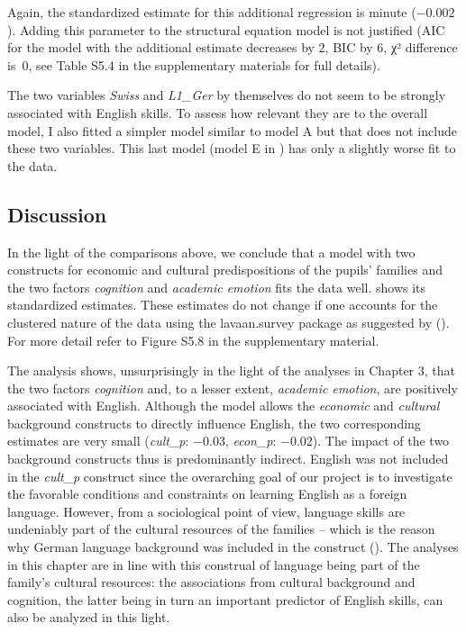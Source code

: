 \documentclass[output=paper]{langsci/langscibook}
\begin{document}
Again, the standardized estimate for this additional regression is minute ($-0.002$). Adding this parameter to the structural equation model is not justified (AIC for the model with the additional estimate decreases by 2, BIC by 6, χ² difference is~0, see Table S5.4 in the supplementary materials for full details).

The two variables \textit{Swiss} and \textit{L1\_Ger} by themselves do not seem to be strongly associated with English skills. To assess how relevant they are to the overall model, I also fitted a simpler model similar to model A but that does not include these two variables. This last model (model E in ) has only a slightly worse fit to the data.

\subsection{Discussion}

In the light of the comparisons above, we conclude that a model with two constructs for economic and cultural predispositions of the pupils’ families and the two factors \textit{cognition} and \textit{academic emotion} fits the data well.  shows its standardized estimates. These estimates do not change if one accounts for the clustered nature of the data using the lavaan.survey package as suggested by \citeauthor{Oberski2014} (\citeyear{Oberski2014}). For more detail refer to Figure S5.8 in the supplementary material.

The analysis shows, unsurprisingly in the light of the analyses in Chapter 3, that the two factors \textit{cognition} and, to a lesser extent, \textit{academic emotion}, are positively associated with English. Although the model allows the \textit{economic} and \textit{cultural} background constructs to directly influence English, the two corresponding estimates are very small (\textit{cult\_p}: $-0.03$, \textit{econ\_p}: $-0.02$). The impact of the two background constructs thus is predominantly indirect. English was not included in the \textit{cult\_p} construct since the overarching goal of our project is to investigate the favorable conditions and constraints on learning English as a foreign language. However, from a sociological point of view, language skills are undeniably part of the cultural resources of the families -- which is the reason why German language background was included in the construct (). The analyses in this chapter are in line with this construal of language being part of the family’s cultural resources: the associations from cultural background and cognition, the latter being in turn an important predictor of English skills, can also be analyzed in this light.
\end{document}
